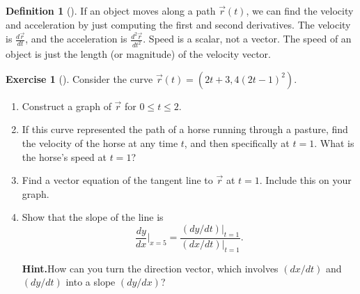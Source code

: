 \documentclass[10pt,]{book}
\theoremstyle{plain}
\theoremstyle{definition}
\newtheorem{definition}[theorem]{Definition}
\theoremstyle{definition}
\theoremstyle{definition}
\theoremstyle{definition}
\newtheorem{exploration}[project]{Exercise}
\theoremstyle{definition}
\numberwithin{equation}{section}
\newcommand{\ds}{\displaystyle}
\begin{document}
\begin{definition}[{}]\label{def_velocity_acceleration}
If an object moves along a path \(\vec r(t)\), we can find the velocity and acceleration by just computing the first and second derivatives. The velocity is \(\frac{d\vec r}{dt}\), and the acceleration is \(\frac{d^2\vec r}{dt^2}\). Speed is a scalar, not a vector. The speed of an object is just the length (or magnitude) of the velocity vector.%
\end{definition}
\begin{exploration}[]\label{exploration-79}
Consider the curve \(\vec r(t) = (2t+3, 4(2t-1)^2)\).%
\begin{enumerate}[font=\bfseries,label=(\alph*),ref=\alph*]
\item\label{task-130} Construct a graph of \(\vec r\) for \(0\leq t\leq 2\).%
\item\label{task-131} If this curve represented the path of a horse running through a pasture, find the velocity of the horse at any time \(t\), and then specifically at \(t=1\). What is the horse's speed at \(t=1\)?%
\item\label{task-132} Find a vector equation of the tangent line to \(\vec r\) at \(t=1\).  Include this on your graph.%
\item\label{task-133} Show that the slope of the line is%
\begin{equation*}
\ds \frac{dy}{dx}\big|_{x=5} 
= 
\frac{
(dy/dt)\big|_{t=1}
}{
(dx/dt)\big|_{t=1}
}.
\end{equation*}
%
\par\medskip\noindent%
\textbf{Hint.}\quad How can you turn the direction vector, which involves \((dx/dt)\) and \((dy/dt)\) into a slope \((dy/dx)\)?%
\end{enumerate}
\end{exploration}
\typeout{************************************************}
\typeout{************************************************}
\end{document}
